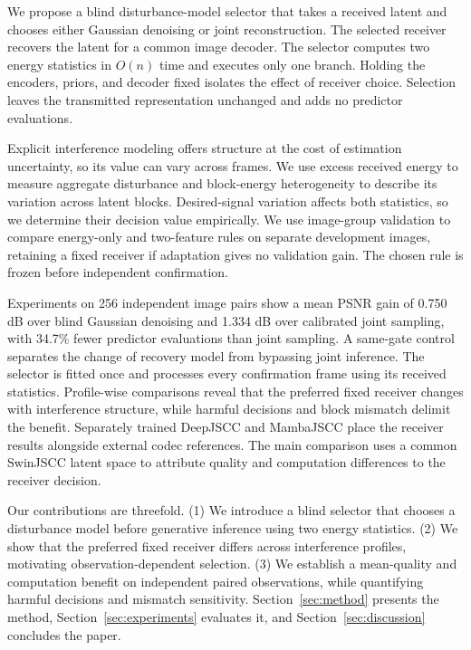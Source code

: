 \documentclass[conference]{IEEEtran}
\begin{document}
We propose a blind disturbance-model selector that takes a received latent
and chooses either Gaussian denoising or joint reconstruction.
The selected receiver recovers the latent for a common image decoder.
The selector computes two energy statistics in $O(n)$ time and executes only
one branch. Holding the encoders, priors, and decoder fixed isolates the effect
of receiver choice. Selection leaves the transmitted representation unchanged
and adds no predictor evaluations.

Explicit interference modeling offers structure at the cost of estimation
uncertainty, so its value can vary across frames. We use excess received energy to
measure aggregate disturbance and block-energy heterogeneity to describe its
variation across latent blocks. Desired-signal variation affects both
statistics, so we determine their decision value empirically. We
use image-group validation to compare energy-only and two-feature rules on
separate development images, retaining a fixed receiver if adaptation gives
no validation gain. The chosen rule is frozen before independent confirmation.

Experiments on 256 independent image pairs show a mean PSNR gain of 0.750 dB
over blind Gaussian denoising and 1.334 dB over calibrated joint sampling,
with 34.7\% fewer predictor evaluations than joint sampling. A same-gate
control separates the change of recovery model from bypassing joint inference.
The selector is fitted once and processes every confirmation frame using its
received statistics. Profile-wise comparisons reveal that the
preferred fixed receiver changes with interference structure, while harmful
decisions and block mismatch delimit the benefit. Separately trained DeepJSCC
and MambaJSCC place the receiver results alongside external codec references.
The main comparison uses a common SwinJSCC latent space to attribute quality
and computation differences to the receiver decision.

Our contributions are threefold. (1) We introduce a blind selector that
chooses a disturbance model before generative inference using two energy
statistics. (2) We show that the preferred fixed receiver differs across
interference profiles, motivating observation-dependent selection.
(3) We establish a mean-quality and computation benefit on independent paired
observations, while quantifying harmful decisions and mismatch sensitivity.
Section~\ref{sec:method} presents the method, Section~\ref{sec:experiments}
evaluates it, and Section~\ref{sec:discussion} concludes the paper.
\end{document}
